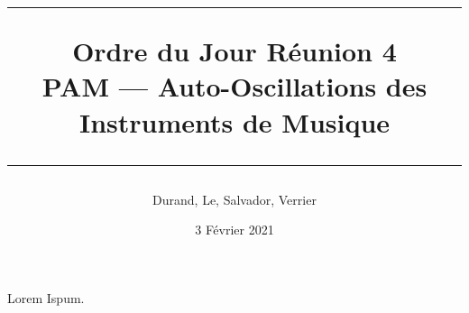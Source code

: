 \documentclass[a4paper, 11pt]{article}
\title{
	\noindent\rule{\linewidth}{0.4pt}
	\huge{Ordre du Jour Réunion 4\\}
	\medskip
	\Large{PAM --- Auto-Oscillations des Instruments de Musique}
	\noindent\rule{\linewidth}{1pt}
}
\author{Durand, Le, Salvador, Verrier}
\date{3 Février 2021}
\begin{document}
\maketitle


Lorem Ispum.
\end{document}
